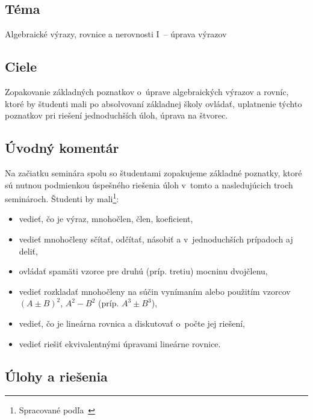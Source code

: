
\subsection*{Téma}
Algebraické výrazy, rovnice a nerovnosti I~-- úprava výrazov

\subsection*{Ciele}
Zopakovanie základných poznatkov o~úprave algebraických výrazov a rovníc, ktoré by študenti mali po absolvovaní základnej školy ovládať, uplatnenie týchto poznatkov pri riešení jednoduchších úloh, úprava na štvorec.

\subsection*{Úvodný komentár}
Na začiatku seminára spolu so študentami zopakujeme základné poznatky, ktoré sú nutnou podmienkou úspešného riešenia úloh v~tomto a nasledujúcich troch seminároch.
Študenti by mali\footnote{Spracované podľa~\cite{kubat2000}}:
\begin{itemize}
\item vedieť, čo je výraz, mnohočlen, člen, koeficient,
\item vedieť mnohočleny sčítať, odčítať, násobiť a v~jednoduchších prípadoch aj deliť,
\item ovládať spamäti vzorce pre druhú (príp. tretiu) mocninu dvojčlenu,
\item vedieť rozkladať mnohočleny na súčin vynímaním alebo použitím vzorcov $(A\pm B)^2$, $A^2-B^2$ (príp. $A^3\pm B^3$),
\item vedieť, čo je lineárna rovnica a diskutovať o~počte jej riešení,
\item vedieť riešiť ekvivalentnými úpravami lineárne rovnice.\\
\end{itemize}

\subsection*{Úlohy a riešenia}











